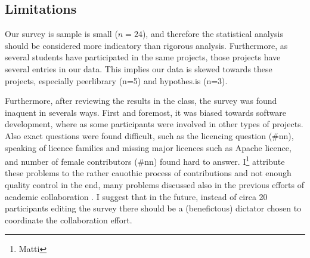\subsection{Limitations}

Our survey is sample is small ($n=24$), and therefore the statistical analysis should be considered more indicatory than rigorous analysis. Furthermore, as several students have participated in the same projects, those projects have several entries in our data. This implies our data is skewed towards these projects, especially peerlibrary (n=5) and hypothes.is (n=3).

Furthermore, after reviewing the results in the class, the survey was found inaquent in severals ways. First and foremost, it was biased towards software development, where as some participants were involved in other types of projects. Also exact questions were found difficult, such as the licencing question (\#nn), speaking of licence families and missing major licences such as Apache licence, and number of female contributors (\#nn) found hard to answer. I\footnote{Matti} attribute these problems to the rather cauothic process of contributions and not enough quality control in the end, many problems discussed also in the previous efforts of academic collaboration \cite{Tomlinson2012}. I suggest that in the future, instead of circa 20 participants editing the survey there should be a (benefictous) dictator chosen to coordinate the collaboration effort.